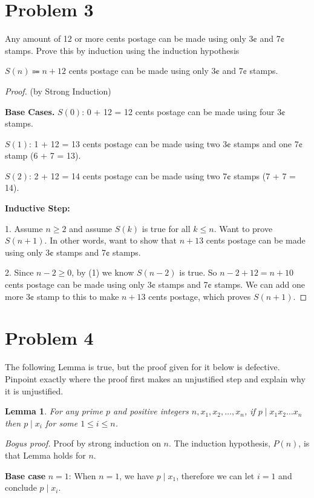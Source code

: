 \documentclass[14pt]{extarticle}
\newtheorem{lemma}{Lemma}
\begin{document}
\section{Problem 3}
Any amount of 12 or more cents postage can be made using only 3¢ and 7¢ stamps. Prove this by induction using the induction hypothesis
\begin{center}
$S(n) \Coloneqq n + 12$ cents postage can be made using only 3¢ and 7¢ stamps.
\end{center}
\begin{proof}
(by Strong Induction)

{\bf Base Cases.} $S(0)$: 0 + 12 = 12 cents postage can be made using four 3¢ stamps.

$S(1)$: 1 + 12 = 13 cents postage can be made using two 3¢ stamps and one 7¢ stamp (6 + 7 = 13).

$S(2)$: 2 + 12 = 14 cents postage can be made using two 7¢ stamps (7 + 7 = 14).

{\bf Inductive Step:} 

1. Assume $n \geq 2$ and assume $S(k)$ is true for all $k \leq n$. Want to prove $S(n+1)$. In other words, want to show that $n + 13$ cents postage can be made using only 3¢ stamps and 7¢ stamps.

2. Since $n - 2 \geq 0$, by (1) we know $S(n - 2)$ is true. So $n - 2 + 12 = n+10$ cents postage can be made using only 3¢ stamps and 7¢ stamps. We can add one more 3¢ stamp to this to make $n+13$ cents postage, which proves $S(n+1)$.
\end{proof}


\section{Problem 4}
The following Lemma is true, but the proof given for it below is defective. Pinpoint exactly where the proof first makes an unjustified step and explain why it is unjustified.

\begin{lemma}
For any prime $p$ and positive integers $n, x_1, x_2, \ldots, x_n$, if $p \mid x_1x_2\ldots x_n$ then $p \mid x_i$ for some $1 \leq i \leq n$.
\end{lemma}

{\it Bogus proof.} Proof by strong induction on $n$. The induction hypothesis, $P(n)$, is that Lemma holds for $n$.

{\bf Base case} $n = 1$: When $n = 1$, we have $p \mid x_1$, therefore we can let $i = 1$ and conclude $p \mid x_i$.
\end{document}
